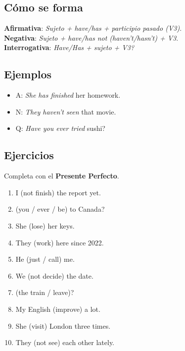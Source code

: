 \documentclass[11pt,a4paper]{article}
\begin{document}
\subsection*{Cómo se forma}
\textbf{Afirmativa}: \emph{Sujeto + have/has + participio pasado (V3)}.\\
\textbf{Negativa}: \emph{Sujeto + have/has not (haven’t/hasn’t) + V3}.\\
\textbf{Interrogativa}: \emph{Have/Has + sujeto + V3?}

\subsection*{Ejemplos}
\begin{itemize}
  \item A: \emph{She has finished} her homework.
  \item N: \emph{They haven’t seen} that movie.
  \item Q: \emph{Have you ever tried} sushi?
\end{itemize}

\subsection*{Ejercicios}
Completa con el \textbf{Presente Perfecto}.
\begin{enumerate}
  \item I \underline{\hspace{2.5cm}} (not finish) the report yet.
  \item \underline{\hspace{2.5cm}} (you / ever / be) to Canada?
  \item She \underline{\hspace{2.5cm}} (lose) her keys.
  \item They \underline{\hspace{2.5cm}} (work) here since 2022.
  \item He \underline{\hspace{2.5cm}} (just / call) me.
  \item We \underline{\hspace{2.5cm}} (not decide) the date.
  \item \underline{\hspace{2.5cm}} (the train / leave)?
  \item My English \underline{\hspace{2.5cm}} (improve) a lot.
  \item She \underline{\hspace{2.5cm}} (visit) London three times.
  \item They \underline{\hspace{2.5cm}} (not see) each other lately.
\end{enumerate}
\end{document}
